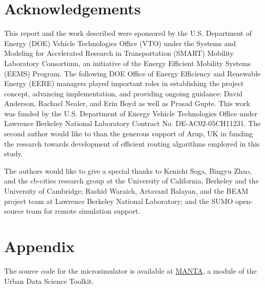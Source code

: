 \documentclass[final]{IEEEtran}
\begin{document}
\section{Acknowledgements}

This report and the work described were sponsored by the U.S. Department of Energy (DOE) Vehicle Technologies Office (VTO) under the Systems and Modeling for Accelerated Research in Transportation (SMART) Mobility Laboratory Consortium, an initiative of the Energy Efficient Mobility Systems (EEMS) Program. The following DOE Office of Energy Efficiency and Renewable Energy (EERE) managers played important roles in establishing the project concept, advancing implementation, and providing ongoing guidance: David Anderson, Rachael Nealer, and Erin Boyd as well as Prasad Gupte. This work was funded by the U.S. Department of Energy Vehicle Technologies Office under Lawrence Berkeley National Laboratory Contract No. DE-AC02-05CH11231. The second author would like to than the generous support of Arup, UK in funding the research towards development of  efficient routing algorithms employed in this study.

The authors would like to give a special thanks to Kenichi Soga, Bingyu Zhao, and the cb-cities research group at the University of California, Berkeley and the University of Cambridge; Rashid Waraich, Artavazd Balayan, and the BEAM project team at Lawrence Berkeley National Laboratory; and the SUMO open-source team for remote simulation support.

\section{Appendix}
The source code for the microsimulator is available at \href{https://github.com/UDST/manta}{MANTA}, a module of the Urban Data Science Toolkit.




\end{document}
